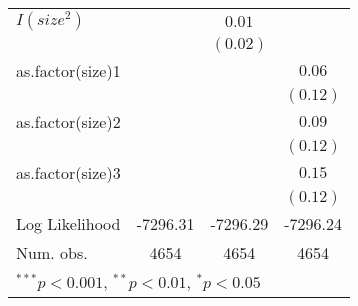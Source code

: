 \begin{table}
\begin{center}
\begin{tabular}{l c c c }
$I(size^2)$        &               & $0.01$        &               \\
                 &               & $(0.02)$      &               \\
as.factor(size)1 &               &               & $0.06$        \\
                 &               &               & $(0.12)$      \\
as.factor(size)2 &               &               & $0.09$        \\
                 &               &               & $(0.12)$      \\
as.factor(size)3 &               &               & $0.15$        \\
                 &               &               & $(0.12)$      \\
\hline
Log Likelihood   & -7296.31      & -7296.29      & -7296.24      \\
Num. obs.        & 4654          & 4654          & 4654          \\
\hline
\multicolumn{4}{l}{\scriptsize{$^{***}p<0.001$, $^{**}p<0.01$, $^*p<0.05$}}
\end{tabular}
\end{center}
\end{table}
